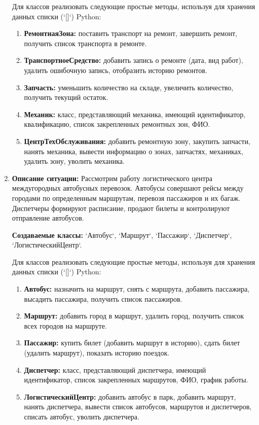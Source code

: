 \begin{enumerate}
Для классов реализовать следующие простые методы, используя для хранения данных списки (`[]`) Python:
\begin{enumerate}
    \item \textbf{РемонтнаяЗона:} поставить транспорт на ремонт, 
    завершить ремонт, получить список транспорта в ремонте.
    \item \textbf{ТранспортноеСредство:} добавить запись о ремонте (дата, вид работ), 
    удалить ошибочную запись, отобразить историю ремонтов.
    \item \textbf{Запчасть:} уменьшить количество на складе, увеличить количество, 
    получить текущий остаток.
    \item \textbf{Механик:} класс, представляющий механика, имеющий идентификатор, 
    квалификацию, список закрепленных ремонтных зон, ФИО.
    \item \textbf{ЦентрТехОбслуживания:} добавить ремонтную зону, закупить запчасти, 
    нанять механика, вывести информацию о зонах, запчастях, механиках, удалить зону, уволить механика.
\end{enumerate}

\item \textbf{Описание ситуации:}
Рассмотрим работу логистического центра междугородных автобусных перевозок. 
Автобусы совершают рейсы между городами по определенным маршрутам, 
перевозя пассажиров и их багаж. Диспетчеры формируют расписание, 
продают билеты и контролируют отправление автобусов.

\textbf{Создаваемые классы:} `Автобус`, `Маршрут`, `Пассажир`, `Диспетчер`, `ЛогистическийЦентр`.

Для классов реализовать следующие простые методы, используя для хранения данных списки (`[]`) Python:
\begin{enumerate}
    \item \textbf{Автобус:} назначить на маршрут, снять с маршрута, 
    добавить пассажира, высадить пассажира, получить список пассажиров.
    \item \textbf{Маршрут:} добавить город в маршрут, удалить город, 
    получить список всех городов на маршруте.
    \item \textbf{Пассажир:} купить билет (добавить маршрут в историю), 
    сдать билет (удалить маршрут), показать историю поездок.
    \item \textbf{Диспетчер:} класс, представляющий диспетчера, 
    имеющий идентификатор, список закрепленных маршрутов, ФИО, график работы.
    \item \textbf{ЛогистическийЦентр:} добавить автобус в парк, 
    добавить маршрут, нанять диспетчера, вывести список автобусов, 
    маршрутов и диспетчеров, списать автобус, уволить диспетчера.
\end{enumerate}


\end{enumerate}
